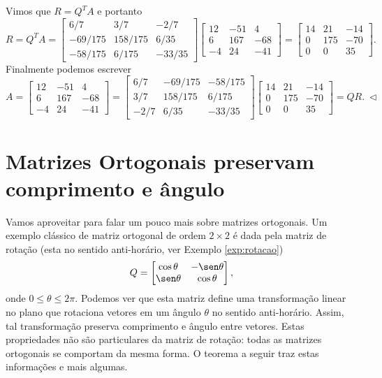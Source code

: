 Vimos que $R=Q^T A$ e portanto
\begin{equation}
R = Q^T A =
\begin{bmatrix}
6/7 & 3/7 & -2/7 \\
-69/175 & 158/175 & 6/35   \\
-58/175& 6/175   &-33/35
\end{bmatrix}
\begin{bmatrix}
12 & -51 & 4 \\
6 & 167 & -68 \\
-4 & 24 & -41
\end{bmatrix} =
\begin{bmatrix}
14&21&-14\\
0&175&-70\\
0&0&35
\end{bmatrix} .
\end{equation}
Finalmente podemos escrever
\begin{equation}
A =
\begin{bmatrix}
12 & -51 & 4 \\
6 & 167 & -68 \\
-4 & 24 & -41
\end{bmatrix} =
\begin{bmatrix}
6/7 & -69/175 & -58/175 \\
3/7 & 158/175 & 6/175   \\
-2/7& 6/35   &-33/35
\end{bmatrix}
\begin{bmatrix}
14&21&-14\\
0&175&-70\\
0&0&35
\end{bmatrix} = QR. \ \lhd
\end{equation}


\section{Matrizes Ortogonais preservam comprimento e ângulo}

Vamos aproveitar para falar um pouco mais sobre matrizes ortogonais. Um exemplo clássico de matriz ortogonal de ordem $2\times 2$ é dada pela matriz de rotação (esta no sentido anti-horário, ver Exemplo \ref{exp:rotacao})
\begin{equation}
Q =
\begin{bmatrix}
\cos \theta & -\sen \theta \\
\sen \theta & \cos \theta
\end{bmatrix} ,\end{equation}
onde $0 \leq \theta \leq 2 \pi$.
Podemos ver que esta matriz define uma transformação linear no plano que rotaciona vetores em um ângulo $\theta$ no sentido anti-horário.
Assim, tal transformação preserva comprimento e ângulo entre vetores.
Estas propriedades não são particulares da matriz de rotação: todas as matrizes ortogonais se comportam da mesma forma. O teorema a seguir traz estas informações e mais algumas.

